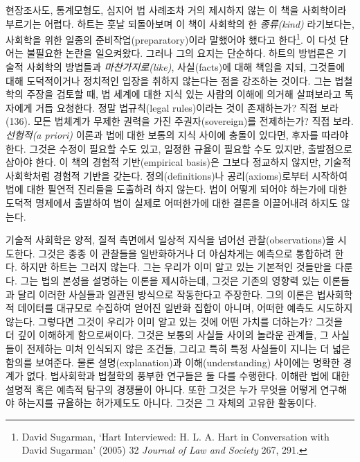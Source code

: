 \documentclass[12pt, oneside]{book}  %
\begin{document}
현장조사도, 통계모형도, 심지어 법 사례조차 거의 제시하지 않는 이 책을
사회학이라 부르기는 어렵다. 하트는 훗날 되돌아보며 이 책이 사회학의 한
\emph{종류(kind)} 라기보다는, 사회학을 위한 일종의
준비작업(preparatory)이라 말했어야 했다고 한다\footnote{David Sugarman,
  `Hart Interviewed: H. L. A. Hart in Conversation with David Sugarman'
  (2005) 32 \emph{Journal of Law and Society} 267, 291.}. 이 다섯 단어는
불필요한 논란을 일으켜왔다. 그러나 그의 요지는 단순하다. 하트의 방법론은
기술적 사회학의 방법들과 \emph{마찬가지로(like)}, 사실(facts)에 대해
책임을 지되, 그것들에 대해 도덕적이거나 정치적인 입장을 취하지 않는다는
점을 강조하는 것이다. 그는 법철학의 주장을 검토할 때, 법 세계에 대한
지식 있는 사람의 이해에 의거해 살펴보라고 독자에게 거듭 요청한다. 정말
법규칙(legal rules)이라는 것이 존재하는가? 직접 보라(136). 모든 법체계가
무제한 권력을 가진 주권자(sovereign)를 전제하는가? 직접 보라.
\emph{선험적(a priori)} 이론과 법에 대한 보통의 지식 사이에 충돌이
있다면, 후자를 따라야 한다. 그것은 수정이 필요할 수도 있고, 일정한
규율이 필요할 수도 있지만, 출발점으로 삼아야 한다. 이 책의 경험적
기반(empirical basis)은 그보다 정교하지 않지만, 기술적 사회학처럼 경험적
기반을 갖는다. 정의(definitions)나 공리(axioms)로부터 시작하여 법에 대한
필연적 진리들을 도출하려 하지 않는다. 법이 어떻게 되어야 하는가에 대한
도덕적 명제에서 출발하여 법이 실제로 어떠한가에 대한 결론을 이끌어내려
하지도 않는다.

기술적 사회학은 양적, 질적 측면에서 일상적 지식을 넘어선
관찰(observations)을 시도한다. 그것은 종종 이 관찰들을 일반화하거나 더
야심차게는 예측으로 통합하려 한다. 하지만 하트는 그러지 않는다. 그는
우리가 이미 알고 있는 기본적인 것들만을 다룬다. 그는 법의 본성을
설명하는 이론을 제시하는데, 그것은 기존의 영향력 있는 이론들과 달리
이러한 사실들과 일관된 방식으로 작동한다고 주장한다. 그의 이론은
법사회학적 데이터를 대규모로 수집하여 얻어진 일반화 집합이 아니며,
어떠한 예측도 시도하지 않는다. 그렇다면 그것이 우리가 이미 알고 있는
것에 어떤 가치를 더하는가? 그것을 더 깊이 이해하게 함으로써이다. 그것은
보통의 사실들 사이의 놀라운 관계들, 그 사실들이 전제하는 미처 인식되지
않은 조건들, 그리고 특히 특정 사실들이 지니는 더 넓은 함의를 보여준다.
물론 설명(explanation)과 이해(understanding) 사이에는 명확한 경계가
없다. 법사회학과 법철학의 풍부한 연구들은 둘 다를 수행한다. 이해란 법에
대한 설명적 혹은 예측적 탐구의 경쟁물이 아니다. 또한 그것은 누가 무엇을
어떻게 연구해야 하는지를 규율하는 허가제도도 아니다. 그것은 그 자체의
고유한 활동이다.
\end{document}
